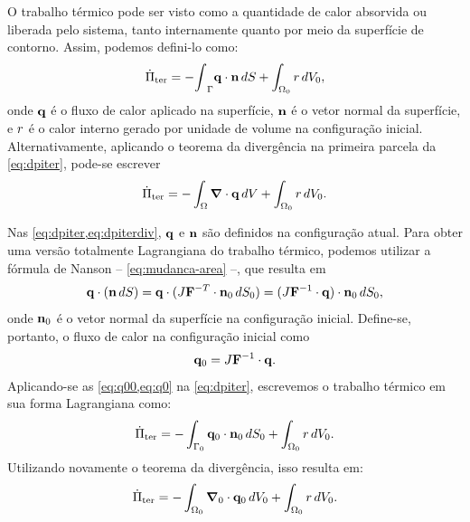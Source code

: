 \documentclass[Tese.tex]{subfiles}
\begin{document}
O trabalho térmico pode ser visto como a quantidade de calor absorvida ou liberada pelo sistema, tanto internamente quanto por meio da superfície de contorno. Assim, podemos defini-lo como:	
\begin{equation}\label{eq:dpiter}
\dot{\Pi}_\text{ter} = -\boldsymbol{\int}_{\Gamma} \mathbf{q}\cdot\mathbf{n}\,dS + \int_{\Omega_0} r\,dV_0,
\end{equation}
onde $\mathbf{q}$ é o fluxo de calor aplicado na superfície, $\mathbf{n}$ é o vetor normal da superfície, e $r$ é o calor interno gerado por unidade de volume na configuração inicial. Alternativamente, aplicando o teorema da divergência na primeira parcela da \cref{eq:dpiter}, pode-se escrever
\begin{equation}\label{eq:dpiterdiv}
\dot{\Pi}_\text{ter} = -\int_{\Omega} \boldsymbol{\nabla}\cdot\mathbf{q}\,dV + \int_{\Omega_0} r\,dV_0.
\end{equation}

Nas \cref{eq:dpiter,eq:dpiterdiv}, $\mathbf{q}$ e $\mathbf{n}$ são definidos na configuração atual. Para obter uma versão totalmente Lagrangiana do trabalho térmico, podemos utilizar a fórmula de Nanson -- \cref{eq:mudanca-area} --, que resulta em
\begin{equation}\label{eq:q00}
\mathbf{q}\cdot(\mathbf{n}\,dS) = \mathbf{q}\cdot(J\mathbf{F}^{-T}\cdot\mathbf{n}_0\,dS_0) = (J\mathbf{F}^{-1}\cdot\mathbf{q})\cdot \mathbf{n}_0\, dS_0,
\end{equation}
onde $\mathbf{n}_0$ é o vetor normal da superfície na configuração inicial. Define-se, portanto, o fluxo de calor na configuração inicial como
\begin{equation}\label{eq:q0}
\mathbf{q}_0 = J\mathbf{F}^{-1}\cdot\mathbf{q}.
\end{equation}		
Aplicando-se as \cref{eq:q00,eq:q0} na \cref{eq:dpiter}, escrevemos o trabalho térmico em sua forma Lagrangiana como:	
\begin{equation}\label{eq:dpiter0}
\dot{\Pi}_\text{ter} = -\int_{\Gamma_0} \mathbf{q}_0\cdot\mathbf{n}_0\,dS_0 + \int_{\Omega_0}r\,dV_0.
\end{equation}
Utilizando novamente o teorema da divergência, isso resulta em:
\begin{equation}\label{eq:dpiter1}
\dot{\Pi}_\text{ter} = -\int_{\Omega_0} \boldsymbol{\nabla}_0\cdot\mathbf{q}_0\,dV_0 + \int_{\Omega_0}r\,dV_0.
\end{equation}
\end{document}
